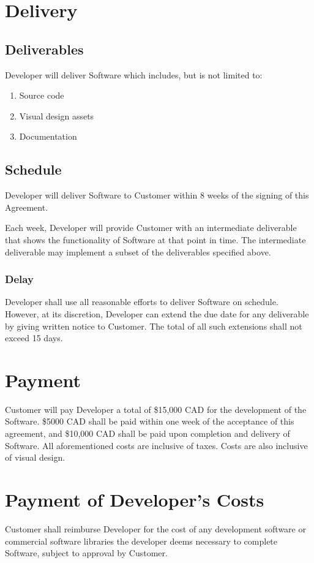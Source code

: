 \documentclass[11pt]{article}
\begin{document}
\section{Delivery}
\subsection{Deliverables}
Developer will deliver Software which includes, but is not limited to:
\begin{enumerate}
\item Source code
\item Visual design assets 
\item Documentation
\end{enumerate}
\subsection{Schedule}
Developer will deliver Software to Customer within 8 weeks of the signing of this Agreement. 

Each week, Developer will provide Customer with an intermediate deliverable that shows the functionality of Software at that point in time. The intermediate deliverable may implement a subset of the deliverables specified above. 
\subsubsection{Delay}
Developer shall use all reasonable efforts to deliver Software on schedule. However, at its discretion, Developer can extend the due date for any deliverable by giving written notice to Customer. The total of all such extensions shall not exceed 15 days. 
\section{Payment}	
Customer will pay Developer a total of \$15,000 CAD for the development of the Software. \$5000 CAD shall be paid within one week of the acceptance of this agreement, and \$10,000 CAD shall be paid upon completion and delivery of Software. All aforementioned costs are inclusive of taxes. Costs are also inclusive of visual design.
\section{Payment of Developer's Costs}
Customer shall reimburse Developer for the cost of any development software or commercial software libraries the developer deems necessary to complete Software, subject to approval by Customer.
\end{document}
